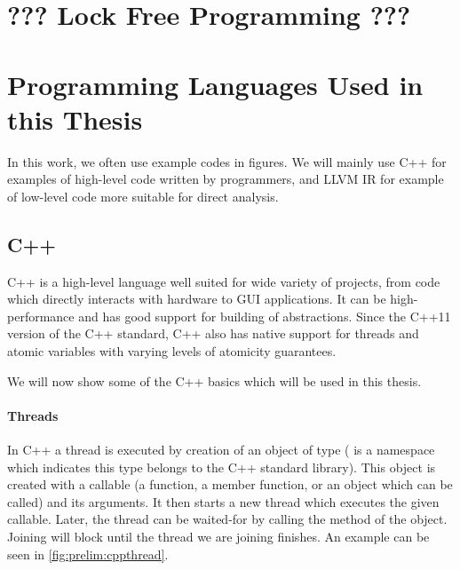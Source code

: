 \section{??? Lock Free Programming ???}

\section{Programming Languages Used in this Thesis}

In this work, we often use example codes in figures.
We will mainly use C++ for examples of high-level code written by programmers,
and LLVM IR for example of low-level code more suitable for direct analysis.

\subsection{C++}

C++ is a high-level language well suited for wide variety of projects, from
code which directly interacts with hardware to GUI applications.
It can be high-performance and has good support for building of abstractions.
Since the C++11 version of the C++ standard, C++ also has native support for
threads and atomic variables with varying levels of atomicity guarantees.

We will now show some of the C++ basics which will be used in this thesis.

\paragraph{Threads}

In C++ a thread is executed by creation of an object of type 
( is a namespace which indicates this type belongs to the C++
standard library).
This object is created with a callable (a function, a member function, or an
object which can be called) and its arguments.
It then starts a new thread which executes the given callable.
Later, the thread can be waited-for by calling the  method of the
 object.
Joining will block until the thread we are joining finishes.
An example can be seen in \autoref{fig:prelim:cppthread}.

